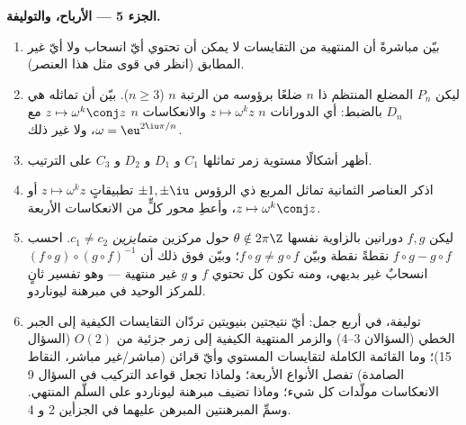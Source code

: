 \begin{problem}
\medskip
\noindent\textbf{الجزء 5 --- الأرباح، والتوليفة.}
\begin{enumerate}[resume]
  \item بيّن مباشرةً أن  المنتهية من التقايسات لا يمكن
        أن تحتوي أيّ انسحاب ولا أيّ  غير
         المطابق (انظر في قوى مثل هذا
        العنصر).
  \item ليكن $P_n$ المضلع المنتظم ذا $n$ ضلعًا برؤوسه
         من الرتبة $n$ ($n \geq 3$). بيّن أن 
        تماثله هي $D_n$ بالضبط: أي الدورانات $n$ $z
        \mapsto \omega^k z$ والانعكاسات $n$ $z \mapsto
        \omega^k \conj z$ مع $\omega = \eu^{2\iu\pi/n}$، ولا
        غير ذلك.
  \item أظهر أشكالًا مستوية زمر تماثلها $C_1$ و
        $D_1$ و $D_2$ و $C_3$ على الترتيب.
  \item اذكر العناصر الثمانية  تماثل
        المربع ذي الرؤوس $\pm1, \pm\iu$ تطبيقاتٍ $z \mapsto
        \omega^k z$ أو $z \mapsto \omega^k\conj z$، وأعطِ
        محور كلٍّ من الانعكاسات الأربعة.
  \item ليكن $f, g$ دورانين بالزاوية نفسها $\theta
        \notin 2\pi\Z$ حول مركزين \emph{متمايزين} $c_1 \neq
        c_2$. احسب $f\circ g - g\circ f$ نقطةً نقطة وبيّن
        $f\circ g \neq g\circ f$؛ وبيّن فوق ذلك أن $(f \circ
        g)\circ(g\circ f)^{-1}$ انسحابٌ غير بديهي، ومنه
        تكون كل  تحتوي $f$ و $g$ غير منتهية ---
        وهو تفسير ثانٍ للمركز الوحيد في مبرهنة
        ليوناردو.
  \item توليفة، في أربع جمل: أيّ نتيجتين بنيويتين
        تردّان التقايسات الكيفية إلى الجبر الخطي
        (السؤالان 3--4) والزمر المنتهية الكيفية إلى
        زمر جزئية من $O(2)$ (السؤال 15)؛ وما القائمة
        الكاملة لتقايسات المستوي وأيّ قرائن
        (مباشر/غير مباشر، النقاط الصامدة) تفصل الأنواع الأربعة؛
        ولماذا تجعل قواعد التركيب في السؤال 9 الانعكاسات
        مولّدات كل شيء؛ وماذا تضيف مبرهنة ليوناردو
        على السلّم المنتهي. وسمِّ المبرهنتين
        المبرهن عليهما في الجزأين 2 و 4.
\end{enumerate}
\end{problem}
